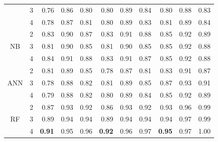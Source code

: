 \documentclass[12pt]{article}
\begin{document}
\begin{table}[H]
\begin{tabular}{lrrrrrrrrrr}
            \multicolumn{1}{c}{} & \multicolumn{1}{c}{3} & 0.76 & 0.86 & \multicolumn{1}{c}{0.80} & 0.80 & 0.89 & \multicolumn{1}{c}{0.84}& 0.80 & 0.88 & \multicolumn{1}{c}{0.83}  \\
            \multicolumn{1}{c}{} & \multicolumn{1}{c}{4} & 0.78 & 0.87 & \multicolumn{1}{c}{0.81} & 0.80 & 0.89 & \multicolumn{1}{c}{0.83} & 0.81 & 0.89 & \multicolumn{1}{c}{0.84}  \\
            \hline
            \multicolumn{1}{c}{\multirow{3}{*}{NB}} & \multicolumn{1}{c}{2} & 0.83 & 0.90 & \multicolumn{1}{c}{0.87} & 0.83 & 0.91 & \multicolumn{1}{c}{0.88}& 0.85 & 0.92 & \multicolumn{1}{c}{0.89}  \\
            \multicolumn{1}{c}{} & \multicolumn{1}{c}{3} & 0.81 & 0.90 & \multicolumn{1}{c}{0.85} & 0.81 & 0.90 & \multicolumn{1}{c}{0.85} & 0.85 & 0.92 & \multicolumn{1}{c}{0.88}  \\
            \multicolumn{1}{c}{} & \multicolumn{1}{c}{4} & 0.84 & 0.91 & \multicolumn{1}{c}{0.88} & 0.83 & 0.91 & \multicolumn{1}{c}{0.87} & 0.85 & 0.92 & \multicolumn{1}{c}{0.88} \\
            \hline
            \multicolumn{1}{c}{\multirow{3}{*}{ANN}} & \multicolumn{1}{c}{2} & 0.81 & 0.89 & \multicolumn{1}{c}{0.85} & 0.78 & 0.87 & \multicolumn{1}{c}{0.81} & 0.83 & 0.91 & \multicolumn{1}{c}{0.87}  \\
            \multicolumn{1}{c}{} & \multicolumn{1}{c}{3} &  0.78 & 0.88 & \multicolumn{1}{c}{0.82} & 0.81 & 0.89 & \multicolumn{1}{c}{0.85} & 0.87 & 0.93 & \multicolumn{1}{c}{0.91}  \\
            \multicolumn{1}{c}{} & \multicolumn{1}{c}{4} & 0.79 & 0.88 & \multicolumn{1}{c}{0.82} & 0.80 & 0.89 & \multicolumn{1}{c}{0.84} & 0.85 & 0.92 & \multicolumn{1}{c}{0.89}  \\
            \hline
            \multicolumn{1}{c}{\multirow{3}{*}{RF}} & \multicolumn{1}{c}{2} & 0.87 & 0.93 & \multicolumn{1}{c}{0.92} & 0.86 & 0.93 & \multicolumn{1}{c}{0.92} & 0.93 & 0.96 & \multicolumn{1}{c}{0.99}  \\
            \multicolumn{1}{c}{} & \multicolumn{1}{c}{3} & 0.89 & 0.94 & \multicolumn{1}{c}{0.94} & 0.89 & 0.94 & \multicolumn{1}{c}{0.94} & 0.94 & 0.97 & \multicolumn{1}{c}{0.99} \\
            \multicolumn{1}{c}{} & \multicolumn{1}{c}{4} & \textbf{0.91} & 0.95 & \multicolumn{1}{c}{0.96} & \textbf{0.92} & 0.96 & \multicolumn{1}{c}{0.97} & \textbf{0.95} & 0.97 & \multicolumn{1}{c}{1.00} \\

\end{tabular}
\end{table}
\end{document}
